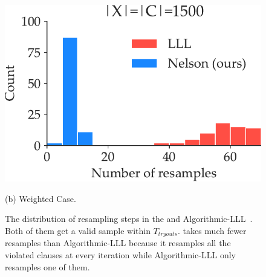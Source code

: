 \begin{figure}[!ht]
    \includegraphics[width=0.245\linewidth]{exp/sat/randkcnf_5_1500_1500_0001.weighted.pdf}
    \begin{center}
      (b) Weighted Case.
    \end{center}
    \caption{The distribution of resampling steps in the \nls and Algorithmic-LLL~\cite{DBLP:journals/jacm/MoserT10}. Both of them get a valid sample within $T_{\mathit{tryouts}}$. \nls takes much fewer resamples than Algorithmic-LLL because it resamples all the violated clauses at every iteration while Algorithmic-LLL only resamples one of them.}\label{fig:ap:resamples}
\end{figure}